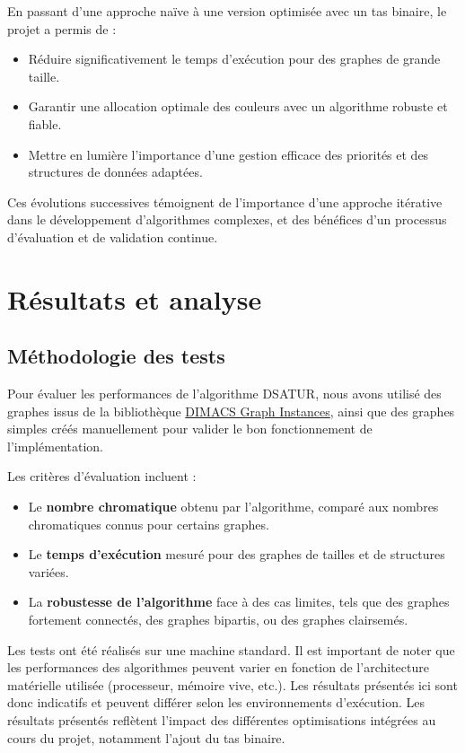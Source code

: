 \documentclass[11pt]{article}
\begin{document}
En passant d’une approche naïve à une version optimisée avec un tas binaire, le projet a permis de :
\begin{itemize}
    \item Réduire significativement le temps d’exécution pour des graphes de grande taille.
    \item Garantir une allocation optimale des couleurs avec un algorithme robuste et fiable.
    \item Mettre en lumière l’importance d’une gestion efficace des priorités et des structures de données adaptées.
\end{itemize}

Ces évolutions successives témoignent de l’importance d’une approche itérative dans le développement d’algorithmes complexes, et des bénéfices d’un processus d’évaluation et de validation continue.

\section{Résultats et analyse}

\subsection{Méthodologie des tests}

Pour évaluer les performances de l’algorithme DSATUR, nous avons utilisé des graphes issus de la bibliothèque \href{https://mat.tepper.cmu.edu/COLOR/instances.html}{DIMACS Graph Instances}, ainsi que des graphes simples créés manuellement pour valider le bon fonctionnement de l’implémentation. 

Les critères d’évaluation incluent :
\begin{itemize}
    \item Le \textbf{nombre chromatique} obtenu par l’algorithme, comparé aux nombres chromatiques connus pour certains graphes.
    \item Le \textbf{temps d’exécution} mesuré pour des graphes de tailles et de structures variées.
    \item La \textbf{robustesse de l’algorithme} face à des cas limites, tels que des graphes fortement connectés, des graphes bipartis, ou des graphes clairsemés.
\end{itemize}

Les tests ont été réalisés sur une machine standard. Il est important de noter que les performances des algorithmes peuvent varier en fonction de l'architecture matérielle utilisée (processeur, mémoire vive, etc.). Les résultats présentés ici sont donc indicatifs et peuvent différer selon les environnements d'exécution.
 Les résultats présentés reflètent l’impact des différentes optimisations intégrées au cours du projet, notamment l’ajout du tas binaire.
\end{document}

